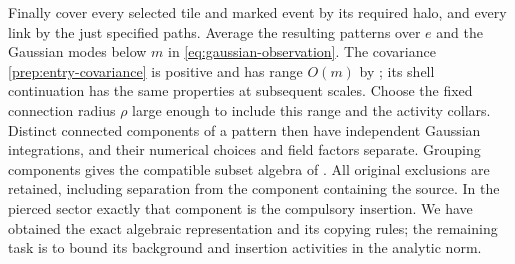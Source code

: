 Finally cover every selected tile and marked event by its required halo,
and every link by the just specified paths.  Average the resulting
patterns over $e$ and the Gaussian modes below $m$ in
\eqref{eq:gaussian-observation}.  The covariance
\eqref{prep:entry-covariance} is positive and has range $O(m)$ by
\cite[Lemma 8.1]{B}; its shell continuation has the
same properties at subsequent scales.  Choose the fixed connection
radius $\rho$ large enough to include this range and the activity
collars.  Distinct connected components of a pattern then have
independent Gaussian integrations, and their numerical choices and
field factors separate.  Grouping components gives the compatible
subset algebra of \cite[Proposition 4.8]{B}.
All original exclusions are retained, including separation from the
component containing the source.  In the pierced sector exactly that
component is the compulsory insertion.  We have obtained the exact
algebraic representation and its copying rules; the remaining task is
to bound its background and insertion activities in the analytic norm.
